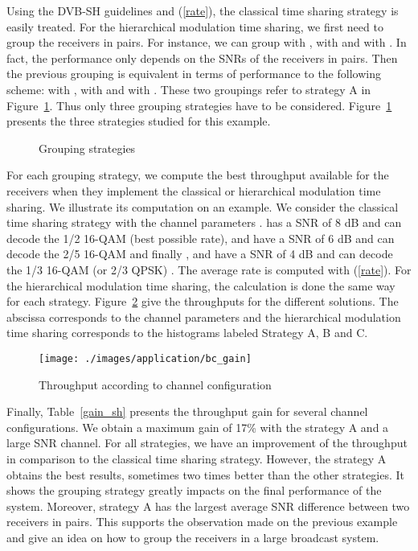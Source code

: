 \documentclass[conference, letterpaper]{IEEEtran}
\begin{document}
Using the DVB-SH guidelines \cite{sh} and (\ref{rate}), the classical time sharing strategy is easily treated. For the hierarchical modulation time sharing, we first need to group the receivers in pairs. For instance, we can group   with ,  with  and  with . In fact, the performance only depends on the SNRs of the receivers in pairs. Then the previous grouping is equivalent in terms of performance to the following scheme:  with ,  with  and  with . These two groupings refer to strategy A in Figure~\ref{grouping_strategies}. Thus only three grouping strategies have to be considered. Figure~\ref{grouping_strategies} presents the three strategies studied for this example. 
\begin{figure}[!ht]
\centerline{
\hfil
{}
\hfil
{}
}\caption{Grouping strategies}
\label{grouping_strategies}
\end{figure}

For each grouping strategy, we compute the best throughput available for the receivers when they implement the classical or hierarchical modulation time sharing. We illustrate its computation on an example. We consider the classical time sharing strategy with the channel parameters .  has a SNR of 8 dB and can decode the 1/2 16-QAM (best possible rate),  and  have a SNR of 6 dB and can decode the 2/5 16-QAM and finally ,  and  have a SNR of 4 dB and can decode the 1/3 16-QAM (or 2/3 QPSK) \cite{sh}. The average rate is computed with (\ref{rate}). For the hierarchical modulation time sharing, the calculation is done the same way for each strategy. Figure~\ref{throughput_bc} give the throughputs for the different solutions. The abscissa corresponds to the channel parameters  and the hierarchical modulation time sharing corresponds to the histograms labeled Strategy A, B and C.

\begin{figure}[!ht]
\centering
\texttt{[image: ./images/application/bc\_gain]}
\caption{Throughput according to channel configuration}
\label{throughput_bc}
\end{figure}

Finally, Table~\ref{gain_sh} presents the throughput gain for several channel configurations. We obtain a maximum gain of 17\% with the strategy A and a large SNR channel. For all strategies, we have an improvement of the throughput in comparison to the classical time sharing strategy. However, the strategy A obtains the best results, sometimes two times better than the other strategies. It shows the grouping strategy greatly impacts on the final performance of the system. Moreover, strategy A has the largest average SNR difference between two receivers in pairs. This supports the observation made on the previous example and give an idea on how to group the receivers in a large broadcast system.
\end{document}
